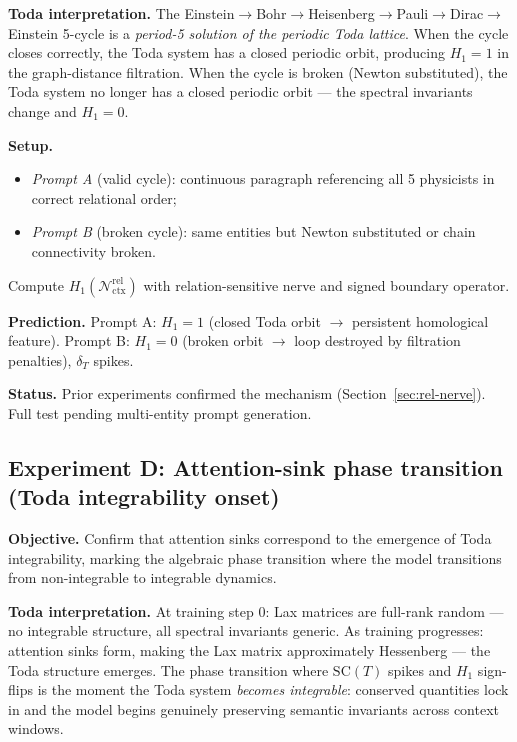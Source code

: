 \documentclass[11pt]{amsart}
\theoremstyle{definition}
\begin{document}
\textbf{Toda interpretation.}
The Einstein$\to$Bohr$\to$Heisenberg$\to$Pauli$\to$Dirac$\to$Einstein
5-cycle is a \emph{period-5 solution of the periodic Toda lattice}.
When the cycle closes correctly, the Toda system has a closed periodic
orbit, producing $H_1 = 1$ in the graph-distance filtration.
When the cycle is broken (Newton substituted), the Toda system no longer
has a closed periodic orbit --- the spectral invariants change and
$H_1 = 0$.

\textbf{Setup.}
\begin{itemize}
  \item \emph{Prompt A} (valid cycle): continuous paragraph referencing
    all 5 physicists in correct relational order;
  \item \emph{Prompt B} (broken cycle): same entities but Newton
    substituted or chain connectivity broken.
\end{itemize}
Compute $H_1(\mathcal{N}_{\mathrm{ctx}}^{\mathrm{rel}})$ with relation-sensitive
nerve and signed boundary operator.

\textbf{Prediction.}
Prompt A: $H_1 = 1$ (closed Toda orbit $\to$ persistent homological feature).
Prompt B: $H_1 = 0$ (broken orbit $\to$ loop destroyed by filtration penalties),
$\delta_T$ spikes.

\textbf{Status.} Prior experiments confirmed the mechanism (Section~\ref{sec:rel-nerve}).
Full test pending multi-entity prompt generation.

\subsection{Experiment D: Attention-sink phase transition (Toda integrability onset)}

\textbf{Objective.}
Confirm that attention sinks correspond to the emergence of Toda
integrability, marking the algebraic phase transition where the
model transitions from non-integrable to integrable dynamics.

\textbf{Toda interpretation.}
At training step 0: Lax matrices are full-rank random --- no integrable
structure, all spectral invariants generic.
As training progresses: attention sinks form, making the Lax matrix
approximately Hessenberg --- the Toda structure emerges.
The phase transition where $\mathrm{SC}(T)$ spikes and $H_1$ sign-flips
is the moment the Toda system \emph{becomes integrable}:
conserved quantities lock in and the model begins genuinely preserving
semantic invariants across context windows.
\end{document}
